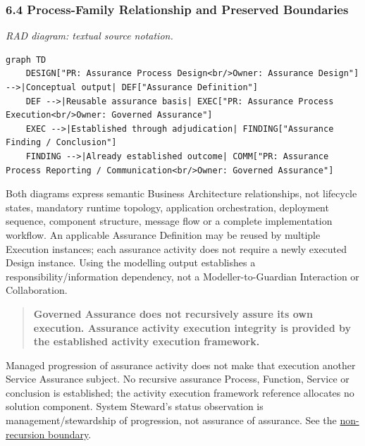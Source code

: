\subsubsection*{6.4 Process-Family Relationship and Preserved Boundaries}
\label{rad:processes:400}

\textit{RAD diagram: textual source notation.}
\begin{Verbatim}[breaklines,fontsize=\footnotesize]
graph TD
    DESIGN["PR: Assurance Process Design<br/>Owner: Assurance Design"] -->|Conceptual output| DEF["Assurance Definition"]
    DEF -->|Reusable assurance basis| EXEC["PR: Assurance Process Execution<br/>Owner: Governed Assurance"]
    EXEC -->|Established through adjudication| FINDING["Assurance Finding / Conclusion"]
    FINDING -->|Already established outcome| COMM["PR: Assurance Process Reporting / Communication<br/>Owner: Governed Assurance"]
\end{Verbatim}
\label{rad:processes:408}

Both diagrams express semantic Business Architecture relationships, not lifecycle states, mandatory runtime topology, application orchestration, deployment sequence, component structure, message flow or a complete implementation workflow. An applicable Assurance Definition may be reused by multiple Execution instances; each assurance activity does not require a newly executed Design instance. Using the modelling output establishes a responsibility/\allowbreak{}information dependency, not a Modeller-to-Guardian Interaction or Collaboration.

\label{rad:processes:410}

\begin{quote}

\textbf{Governed Assurance does not recursively assure its own execution. Assurance activity execution integrity is provided by the established activity execution framework.}


\end{quote}
\label{rad:processes:412}

Managed progression of assurance activity does not make that execution another Service Assurance subject. No recursive assurance Process, Function, Service or conclusion is established; the activity execution framework reference allocates no solution component. System Steward's status observation is management/\allowbreak{}stewardship of progression, not assurance of assurance. See the \href{https://github.com/fhirfactory/harmonia/blob/98410db60155198a75f74c79d98060070209faa1/docs/markdown/03-business-architecture/behaviours/health-service-assurance.md\#assurance-non-recursion-boundary}{non-recursion boundary}.


